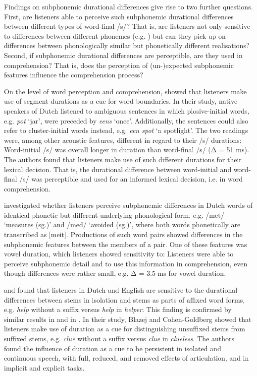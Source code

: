 Findings on subphonemic durational differences give rise to two further questions. First, are listeners able to perceive such subphonemic durational differences between different types of word-final /s/? That is, are listeners not only sensitive to differences between different phonemes (e.g. \cite{Goldstone2010}) but can they pick up on differences between phonologically similar but phonetically different realisations? Second, if subphonemic durational differences are perceptible, are they used in comprehension? That is, does the perception of (un-)expected subphonemic features influence the comprehension process?

On the level of word perception and comprehension, \citet{Shatzman2006} showed that listeners make use of segment durations as a cue for word boundaries. In their study, native speakers of Dutch listened to ambiguous sentences in which plosive-initial words, e.g. \textit{pot} ‘jar’, were preceded by \textit{eens} ‘once’. Additionally, the sentences could also refer to cluster-initial words instead, e.g. \textit{een spot} ‘a spotlight’. The two readings were, among other acoustic features, different in regard to their /s/ durations: Word-initial /s/ was overall longer in duration than word-final /s/ (Δ = 51 ms). The authors found that listeners make use of such different durations for their lexical decision. That is, the durational difference between word-initial and word-final /s/ was perceptible and used for an informed lexical decision, i.e. in word comprehension.

\citet{Warner2004} investigated whether listeners perceive subphonemic differences in Dutch words of identical phonetic but different underlying phonological form, e.g. /met/ ‘measures (sg.)’ and /med/ ‘avoided (sg.)’, where both words phonetically are transcribed as [meit]. Productions of such word pairs showed differences in the subphonemic features between the members of a pair. One of these features was vowel duration, which listeners showed sensitivity to: Listeners were able to perceive subphonemic detail and to use this information in comprehension, even though differences were rather small, e.g. Δ = 3.5 ms for vowel duration. 

\citet{Kemps2005a} and \citet{Kemps2005b} found that listeners in Dutch and English are sensitive to the durational differences between stems in isolation and stems as parts of affixed word forms, e.g. \textit{help} without a suffix versus \textit{help} in \textit{helper}. This finding is confirmed by similar results in \citet{Lee2020} and in \citet{Blazej2015}. In their study,  Blazej and Cohen-Goldberg showed that listeners make use of duration as a cue for distinguishing unsuffixed stems from suffixed stems, e.g. \textit{clue} without a suffix versus \textit{clue} in \textit{clueless}. The authors found the influence of duration as a cue to be persistent in isolated and continuous speech, with full, reduced, and removed effects of articulation, and in implicit and explicit tasks. 

